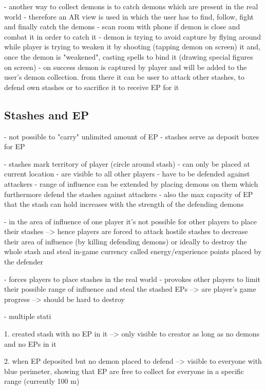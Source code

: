 - another way to collect demons is to catch demons which are present in the real world
- therefore an AR view is used in which the user has to find, follow, fight and finally catch the demons
- scan room with phone if demon is close and combat it in order to catch it
- demon is trying to avoid capture by flying around while player is trying to weaken it by shooting (tapping demon on screen) it and, once the demon is "weakened", casting spells to bind it (drawing special figures on screen)
- on success demon is captured by player and will be added to the user's demon collection. from there it can be user to attack other stashes, to defend own stashes or to sacrifice it to receive EP for it

\subsection{Stashes and EP}
\label{subsec:stashesandep}

- not possible to "carry" unlimited amount of EP 
- stashes serve as deposit boxes for EP

- stashes mark territory of player (circle around stash)
- can only be placed at current location
- are visible to all other players 
- have to be defended against attackers
- range of influence can be extended by placing demons on them which furthermore defend the stashes against attackers 
- also the max capacity of EP that the stash can hold increases with the strength of the defending demons

- in the area of influence of one player it's not possible for other players to place their stashes --> hence players are forced to attack hostile stashes to decrease their area of influence (by killing defending demons) or ideally to destroy the whole stash and steal in-game currency called energy/experience points placed by the defender

- forces players to place stashes in the real world 
- provokes other players to limit their possible range of influence and steal the stashed EPs
--> are player's game progress
--> should be hard to destroy

- multiple stati

1. created stash with no EP in it --> only visible to creator as long as no demons and no EPs in it

2. when EP deposited but no demon placed to defend --> visible to everyone with blue perimeter, showing that EP are free to collect for everyone in a specific range (currently 100 m)

